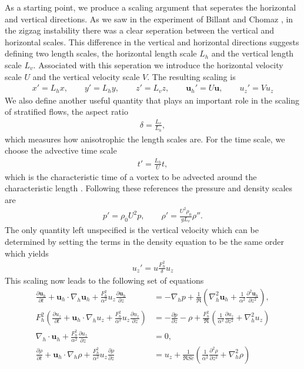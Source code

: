 As a starting point, we produce a scaling argument that seperates the horizontal and vertical directions. As we saw in the experiment of Billant and Chomaz \cite{bc2000a}, in the zigzag instability there was a clear seperation between the vertical and horizontal scales. This difference in the vertical and horizontal directions suggests defining two length scales, the horizontal length scale $L_{h}$ and the vertical length scale $L_{v}$. Associated with this seperation we introduce the horizontal velocity scale $U$ and the vertical velocity scale $V$. The resulting scaling is
\begin{align}
x'=L_{h}x,\qquad y' =L_{h}y, \qquad z'=L_{v}z, \qquad \textbf{u}_{h}' = U\textbf{u}, \qquad u_{z}' = Vu_{z}
\end{align}
We also define another useful quantity that plays an important role in the scaling of stratified flows, the aspect ratio
\begin{align}
\delta = \frac{L_{v}}{L_{h}},
\end{align}
which measures how anisotrophic the length scales are. For the time scale, we choose the advective time scale 
\begin{align}
t' = \frac{L_{h}}{U}t,
\end{align}
which is the characteristic time of a vortex to be advected around the characteristic length \cite{rileylelong2000,bc2001,lilly1983}. Following these references the pressure and density scales are
\begin{align}
p' = \rho_{0}U^{2}p, \qquad \rho' = \frac{U^{2}\rho_{0}}{gL_{v}}\rho''.
\end{align}
The only quantity left unspecified is the vertical velocity which can be determined by setting the terms in the density equation to be the same order which yields
\begin{align}
u_{z}' = u\frac{F_{h}^{2}}{\delta}u_{z}
\end{align}
This scaling now leads to the following set of equations \cite{rileylindborg2013}
\begin{align}
\frac{\partial \textbf{u}_{h}}{\partial t} + \textbf{u}_{h}\cdot\nabla_{h}\textbf{u}_{h}+\frac{F_{h}^{2}}{\alpha^{2}}u_{z}\frac{\partial \textbf{u}_{h}}{\partial z} &= -\nabla_{h}p + \frac{1}{\Re}\left(\nabla^{2}_{h}\textbf{u}_{h}+\frac{1}{\alpha^{2}}\frac{\partial^{2}\textbf{u}_{h}}{\partial z^{2}}\right),\\
F_{h}^{2}\left(\frac{\partial u_{z}}{\partial t} + \textbf{u}_{h}\cdot\nabla_{h}u_{z}+\frac{F_{h}^{2}}{\alpha^{2}}u_{z}\frac{\partial u_{z}}{\partial z}\right) &= -\frac{\partial p}{\partial z} - \rho + \frac{F_{h}^{2}}{\Re}\left(\frac{1}{\alpha^{2}}\frac{\partial u_{z}}{\partial z^{2}} + \nabla^{2}_{h}u_{z}\right)\\
\nabla_{h}\cdot\textbf{u}_{h} + \frac{F_{h}^{2}}{\alpha^{2}}\frac{\partial u_{z}}{\partial z} &=0,\\
\frac{\partial \rho}{\partial t} + \textbf{u}_{h}\cdot\nabla_{h}\rho + \frac{F_{h}^{2}}{\alpha^{2}}u_{z}\frac{\partial \rho}{\partial z} &= u_{z} + \frac{1}{\Re Sc}\left(\frac{1}{\alpha^{2}}\frac{\partial^{2}\rho}{\partial z^{2}} + \nabla^{2}_{h}\rho\right)
\end{align} 
